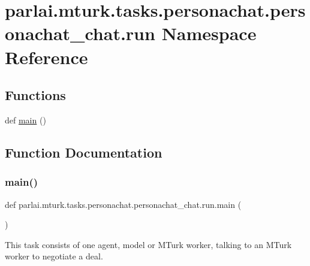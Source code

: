 \hypertarget{namespaceparlai_1_1mturk_1_1tasks_1_1personachat_1_1personachat__chat_1_1run}{}\section{parlai.\+mturk.\+tasks.\+personachat.\+personachat\+\_\+chat.\+run Namespace Reference}
\label{namespaceparlai_1_1mturk_1_1tasks_1_1personachat_1_1personachat__chat_1_1run}
\subsection*{Functions}
\begin{DoxyCompactItemize}
\item 
def \hyperlink{namespaceparlai_1_1mturk_1_1tasks_1_1personachat_1_1personachat__chat_1_1run_a1ba907ef6c5ac6a41561053ca22901d2}{main} ()
\end{DoxyCompactItemize}


\subsection{Function Documentation}
\mbox{\label{namespaceparlai_1_1mturk_1_1tasks_1_1personachat_1_1personachat__chat_1_1run_a1ba907ef6c5ac6a41561053ca22901d2}} 
\subsubsection{\texorpdfstring{main()}{main()}}
{\footnotesize\ttfamily def parlai.\+mturk.\+tasks.\+personachat.\+personachat\+\_\+chat.\+run.\+main (\begin{DoxyParamCaption}{ }\end{DoxyParamCaption})}

\begin{DoxyVerb}This task consists of one agent, model or MTurk worker, talking to an MTurk worker
to negotiate a deal.
\end{DoxyVerb}
 